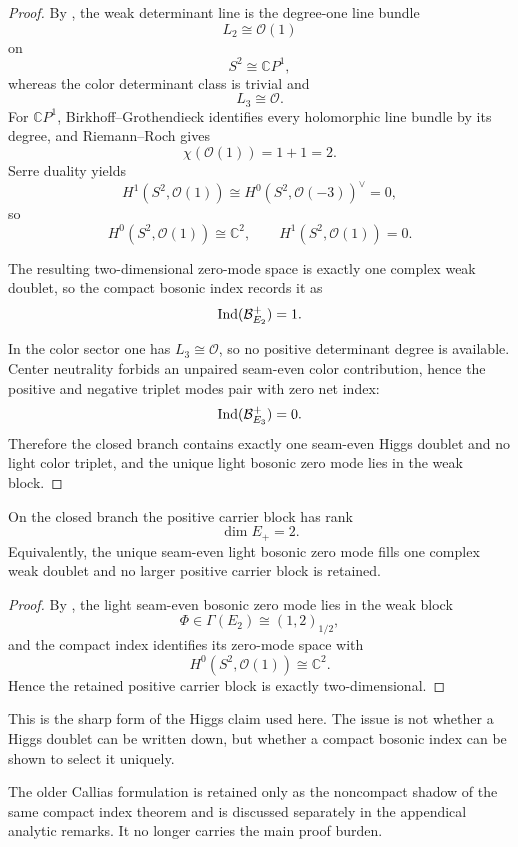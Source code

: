 \begin{proof}
By , the weak determinant line is the degree-one line
bundle
\[
L_2\cong\mathcal O(1)
\]
on
\[
S^2\cong\mathbb CP^1,
\]
whereas the color determinant class is trivial and
\[
L_3\cong\mathcal O.
\]
For $\mathbb CP^1$, Birkhoff--Grothendieck identifies every holomorphic line bundle by its degree,
and Riemann--Roch gives
\[
\chi(\mathcal O(1))=1+1=2.
\]
Serre duality yields
\[
H^1(S^2,\mathcal O(1))
\cong
H^0(S^2,\mathcal O(-3))^\vee
=0,
\]
so
\[
H^0(S^2,\mathcal O(1))\cong\mathbb C^2,
\qquad
H^1(S^2,\mathcal O(1))=0.
\]

The resulting two-dimensional zero-mode space is exactly one complex weak doublet, so the compact
bosonic index records it as
\[
\operatorname{Ind}(\mathcal B_{E_2}^+)=1.
\]

In the color sector one has $L_3\cong\mathcal O$, so no positive determinant degree is available.
Center neutrality forbids an unpaired seam-even color contribution, hence the positive and negative
triplet modes pair with zero net index:
\[
\operatorname{Ind}(\mathcal B_{E_3}^+)=0.
\]
Therefore the closed branch contains exactly one seam-even Higgs doublet and no light color
triplet, and the unique light bosonic zero mode lies in the weak block.
\end{proof}

\begin{corollary}
\label{cor:bosonic-rank-two}
On the closed branch the positive carrier block has rank
\[
\dim E_+=2.
\]
Equivalently, the unique seam-even light bosonic zero mode fills one complex weak doublet and no
larger positive carrier block is retained.
\end{corollary}

\begin{proof}
By , the light seam-even bosonic zero mode lies in the weak block
\[
\Phi\in\Gamma(E_2)\cong (1,2)_{1/2},
\]
and the compact index identifies its zero-mode space with
\[
H^0(S^2,\mathcal O(1))\cong\mathbb C^2.
\]
Hence the retained positive carrier block is exactly two-dimensional.
\end{proof}

This is the sharp form of the Higgs claim used here. The issue is not whether a Higgs doublet can
be written down, but whether a compact bosonic index can be shown to select it uniquely.
\begin{remark}
The older Callias formulation is retained only as the noncompact shadow of the same compact index
theorem and is discussed separately in the appendical analytic remarks. It no longer carries the
main proof burden.
\end{remark}

